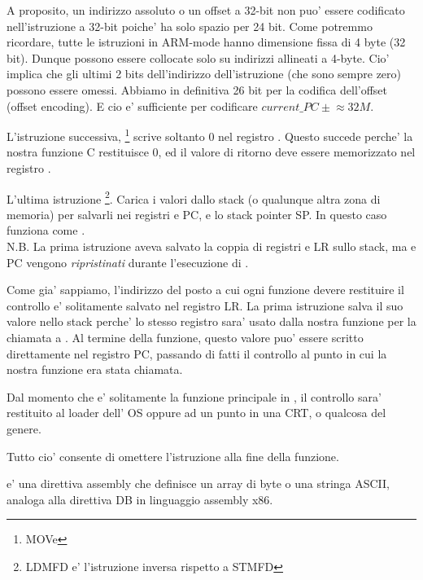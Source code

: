 A proposito, un indirizzo assoluto o un offset a 32-bit non puo' essere codificato nell'istruzione a 32-bit  poiche' ha solo spazio per 24 bit.
Come potremmo ricordare, tutte le istruzioni in ARM-mode hanno dimensione fissa di 4 byte (32 bit).
Dunque possono essere collocate solo su indirizzi allineati a 4-byte.
Cio' implica che gli ultimi 2 bits dell'indirizzo dell'istruzione (che sono sempre zero) possono essere omessi.
Abbiamo in definitiva 26 bit per la codifica dell'offset (offset encoding). E cio e' sufficiente per codificare $current\_PC \pm{} \approx{}32M$.

L'istruzione successiva, \footnote{\ITAph{} MOVe} scrive soltanto 0 nel registro .
Questo succede perche' la nostra funzione C restituisce 0, ed il valore di ritorno deve essere memorizzato nel registro .

L'ultima istruzione \footnote{\ac{LDMFD} e' l'istruzione inversa rispetto a  \ac{STMFD}}.
Carica i valori dallo stack (o qualunque altra zona di memoria) per salvarli nei registri  e \ac{PC}, e  lo \gls{stack pointer} \ac{SP}.
In questo caso funziona come \POP.\\
N.B. La prima istruzione  aveva salvato la coppia di registri  e \ac{LR} sullo stack, ma  e \ac{PC} vengono \emph{ripristinati} durante l'esecuzione di .

Come gia' sappiamo, l'indirizzo del posto a cui ogni funzione devere restituire il controllo e' solitamente salvato nel registro \ac{LR}.
La prima istruzione salva il suo valore nello stack perche' lo stesso registro sara' usato dalla nostra funzione \main per la chiamata a \printf.
Al termine della funzione, questo valore puo' essere scritto direttamente nel registro \ac{PC}, passando di fatti il controllo al punto in cui la nostra funzione era stata chiamata.

Dal momento che \main e' solitamente la funzione principale in \CCpp,
il controllo sara' restituito al loader dell' \ac{OS} oppure ad un punto in una \ac{CRT},
o qualcosa del genere.

Tutto cio' consente di omettere l'istruzione  alla fine della funzione.

 e' una direttiva assembly che definisce un array di byte o una stringa ASCII, analoga alla direttiva DB in linguaggio assembly x86.

